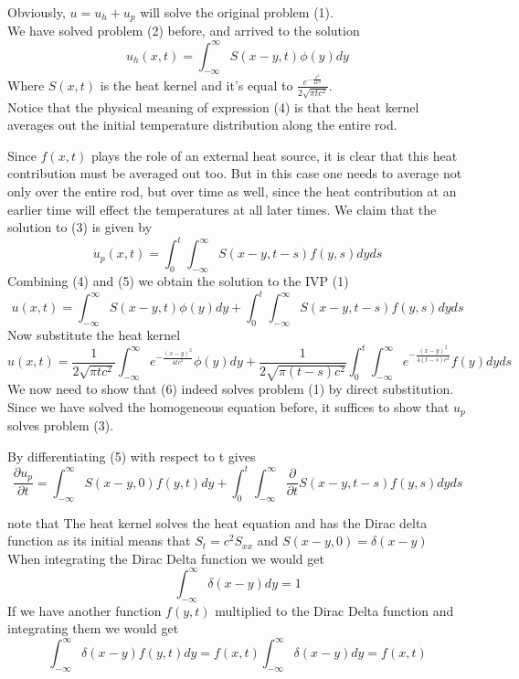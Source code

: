 \documentclass[]{article}
\begin{document}
Obviously, $u = u_h + u_p$ will solve the original problem (1).
\\
We have solved problem (2) before, and arrived to the solution
\begin{equation}
    u_h(x,t) = \int_{-\infty}^{\infty}S(x-y,t) \phi(y)dy        
\end{equation}
Where $S(x,t)$ is the heat kernel and it's equal to $\displaystyle \frac{\textstyle e^{-\frac{x^2}{4tc^2}}}{2\sqrt{\pi tc^2}}$.
\\
Notice that the physical meaning of expression (4) is that the heat
kernel averages out the initial temperature distribution along the entire rod.
\par
Since $f(x, t)$ plays the role of an external heat source, it is clear that this heat contribution must be averaged out too. 
But in this case one needs to average not only over the entire rod, but over time as well, 
since the heat contribution at an earlier time will effect the temperatures at all later times. 
We claim that the solution to (3) is given by
\begin{equation}
    u_p(x,t) = \int_{0}^{t}\int_{-\infty}^{\infty}S(x-y,t-s) f(y,s)dyds
\end{equation}
Combining (4) and (5) we obtain the solution to the IVP (1)
\begin{equation}
    u(x,t)  = \int_{-\infty}^{\infty}S(x-y,t) \phi(y)dy + \int_{0}^{t}\int_{-\infty}^{\infty}S(x-y,t-s) f(y,s)dyds
\end{equation}
Now substitute the heat kernel
\[
    u(x,t) = \frac{1}{2\sqrt{\pi tc^2}}\int_{-\infty}^{\infty}e^{\textstyle -\frac{{(x-y)}^2}{4tc^2}} \phi(y)dy + \frac{1}{2\sqrt{\pi (t-s)c^2}} \int_{0}^{t} \int_{-\infty}^{\infty}e^{\textstyle -\frac{{(x-y)}^2}{4(t-s)c^2}} f(y)dyds            
\]
We now need to show that (6) indeed solves problem (1) by direct substitution. 
\\
Since we have solved the homogeneous equation before, it suffices to show that $u_p$ solves problem (3). 
\par
By differentiating (5) with respect to t gives
\[
    \frac{\partial u_p}{\partial t} = \int_{-\infty}^{\infty}S(x-y,0) f(y,t) dy  + \int_{0}^{t}\int_{-\infty}^{\infty}\frac{\partial}{\partial t}S(x-y,t-s) f(y,s)dyds    
\]
\begin{enrichment*}{}
    note that The heat kernel solves the heat equation and has the Dirac delta function as its initial
    means that $S_t =c^2 S_{xx}$ and $S(x-y,0) = \delta(x-y)$
    \\
    When integrating the Dirac Delta function we would get
    \[
        \int_{-\infty}^{\infty}\delta(x-y) dy = 1
    \]
    If we have another function $f(y,t)$ multiplied to the Dirac Delta function and integrating them we would get
    \[
        \int_{-\infty}^{\infty}\delta(x-y) f(y,t) dy = f(x,t)\int_{-\infty}^{\infty}\delta(x-y) dy = f(x,t) 
    \]
\end{enrichment*}
\end{document}
